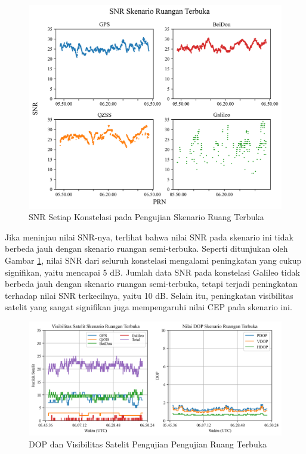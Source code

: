 \begin{figure}[H]
	\centering
	\includegraphics[width=13cm]{contents/chapter-4/4-skenario-outdoor/snr.png}
	\caption{SNR Setiap Konstelasi pada Pengujian Skenario Ruang Terbuka}
	\label{Fig: outdoor-snr}
\end{figure}

Jika meninjau nilai SNR-nya, terlihat bahwa nilai SNR pada skenario ini tidak berbeda jauh dengan skenario ruangan semi-terbuka. Seperti ditunjukan oleh Gambar \ref{Fig: outdoor-snr}, nilai SNR dari seluruh konstelasi mengalami peningkatan yang cukup signifikan, yaitu mencapai 5 dB. Jumlah data SNR pada konstelasi Galileo tidak berbeda jauh dengan skenario ruangan semi-terbuka, tetapi terjadi peningkatan terhadap nilai SNR terkecilnya, yaitu 10 dB. Selain itu, peningkatan visibilitas satelit yang sangat signifikan juga mempengaruhi nilai CEP pada skenario ini. 

\begin{figure}[H]
	\centering
	\begin{adjustbox}{width=\textwidth}
		\includegraphics{contents/chapter-4/4-skenario-outdoor/sats_dop.png}
	\end{adjustbox}
	\caption{DOP dan Visibilitas Satelit Pengujian Pengujian Ruang Terbuka}
	\label{Fig: outdoor-dop_sats}
\end{figure}

